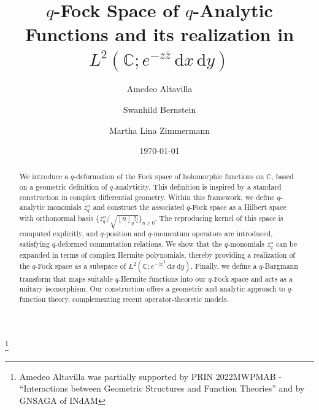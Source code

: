 \documentclass[10pt]{amsart}
\theoremstyle{plain}
\theoremstyle{definition}
\renewcommand{\bar}[1]{\overline{#1}}
\def\ge{\geqslant}
\begin{document}
\parskip1pt

\title[$q$-Fock Space of $q$-Analytic Functions]{$q$-Fock Space of $q$-Analytic Functions and its realization in $L^{2}(\mathbb{C}; e^{-z\bar z} \,\mathrm{d}x\,\mathrm{d}y)$}

\author[A. Altavilla]{Amedeo Altavilla}\address{Dipartimento di Matematica,
  Universit\`a degli Studi di Bari Aldo Moro, via Edoardo Orabona, 4, 70125,
  Bari, Italia}

\author[S. Bernstein]{Swanhild Bernstein}\address{
Fakult\"at f\"ur Mathematik und Informatik, Institut f\"ur Angewandte Analysis,
TU Bergakademie Freiberg, Pr\"uferstra\ss e, 9, 09599, Freiberg, Germany}



\author[M. L. Zimmermann]{Martha Lina Zimmermann}\address{
Fakult\"at f\"ur Mathematik und Informatik, Institut f\"ur Angewandte Analysis,
TU Bergakademie Freiberg, Pr\"uferstra\ss e, 9, 09599, Freiberg, Germany}





\thanks{Amedeo Altavilla was partially supported by PRIN 2022MWPMAB - ``Interactions between Geometric Structures and Function Theories'' and by GNSAGA of INdAM}

\date{\today}





\begin{abstract}
We introduce a $q$-deformation of the Fock space of holomorphic functions on $\mathbb{C}$, based on a geometric definition of $q$-analyticity. This definition is inspired by 
a standard construction in complex differential geometry. Within this framework, we define $q$-analytic monomials $z_q^n$ and construct the associated $q$-Fock space as a Hilbert space with orthonormal basis $\{z_q^n/\sqrt{[n]_q!]}\}_{n\ge 0}$. The reproducing kernel  of this space is computed explicitly, and $q$-position and $q$-momentum operators are introduced, satisfying $q$-deformed commutation relations. We show that the $q$-monomials $z_q^n$ can be expanded in terms of complex Hermite polynomials, thereby providing a realization of the $q$-Fock space as a subspace of $L^2(\mathbb{C}; e^{-|z|^2}\,\mathrm{d}x\,\mathrm{d}y)$. Finally, we define a $q$-Bargmann transform that maps suitable $q$-Hermite functions into our $q$-Fock space and acts as a unitary isomorphism. Our construction offers a geometric and analytic approach to $q$-function theory, complementing recent operator-theoretic models.\end{abstract}
\end{document}
